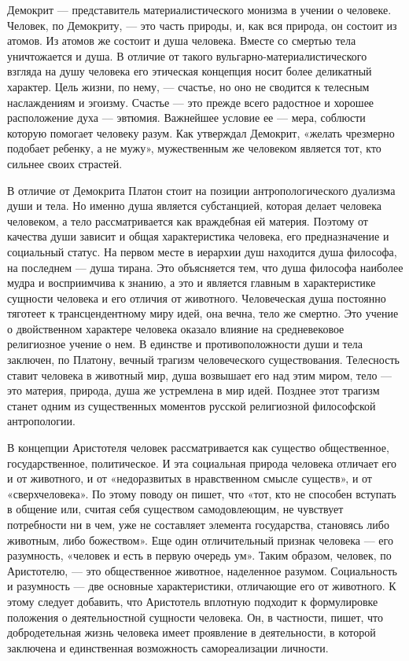 \documentclass[12pt]{article}
\begin{document}
Демокрит — представитель материалистического монизма в учении о человеке. Человек, по Демокриту, — это
часть природы, и, как вся природа, он состоит из атомов. Из атомов же состоит и душа человека. Вместе со
смертью  тела уничтожается  и душа.  В отличие  от такого вульгарно-материалистического  взгляда  на душу
человека его этическая концепция носит более деликатный характер. Цель жизни, по нему, — счастье, но оно не
сводится к телесным наслаждениям и эгоизму. Счастье — это прежде всего радостное и хорошее расположение
духа — эвтюмия. Важнейшее условие ее — мера, соблюсти которую помогает человеку разум. Как утверждал
Демокрит, «желать чрезмерно подобает ребенку, а не мужу», мужественным же человеком является тот, кто
сильнее своих страстей.

В отличие от Демокрита Платон стоит на позиции антропологического дуализма души и тела. Но именно душа
является субстанцией, которая делает человека человеком, а тело рассматривается как враждебная ей материя.
Поэтому от качества души зависит и общая характеристика человека, его предназначение и социальный статус.
На первом месте в иерархии душ находится душа философа, на последнем — душа тирана. Это объясняется
тем, что душа философа наиболее мудра и восприимчива к знанию, а это и является главным в характеристике
сущности человека и его отличия от животного.
Человеческая душа постоянно тяготеет к трансцендентному миру идей, она вечна, тело же смертно. Это учение
о двойственном характере человека оказало влияние на средневековое религиозное учение о нем. В единстве и
противоположности  души  и  тела  заключен,  по  Платону,  вечный  трагизм  человеческого  существования.
Телесность ставит человека  в  животный  мир,  душа  возвышает его  над этим  миром, тело  — это материя,
природа, душа же устремлена в мир идей. Позднее этот трагизм станет одним из существенных моментов
русской религиозной философской антропологии.

В концепции Аристотеля человек рассматривается как существо общественное, государственное, политическое.
И эта социальная природа человека отличает его и от животного, и от «недоразвитых в нравственном смысле
существ», и от «сверхчеловека». По этому поводу он пишет, что «тот, кто не способен вступать в общение или,
считая  себя  существом  самодовлеющим,  не  чувствует  потребности  ни  в  чем,  уже  не  составляет  элемента
государства, становясь либо животным, либо божеством».
Еще один отличительный признак человека — его разумность, «человек и есть в первую очередь ум». Таким
образом,  человек,  по  Аристотелю,  —  это  общественное  животное,  наделенное  разумом.  Социальность  и
разумность — две основные характеристики, отличающие его от животного.
К этому следует добавить, что Аристотель вплотную подходит к формулировке положения о деятельностной
сущности  человека.  Он,  в  частности,  пишет,  что  добродетельная  жизнь  человека  имеет  проявление  в
деятельности, в которой заключена и единственная возможность самореализации личности.
\end{document}
